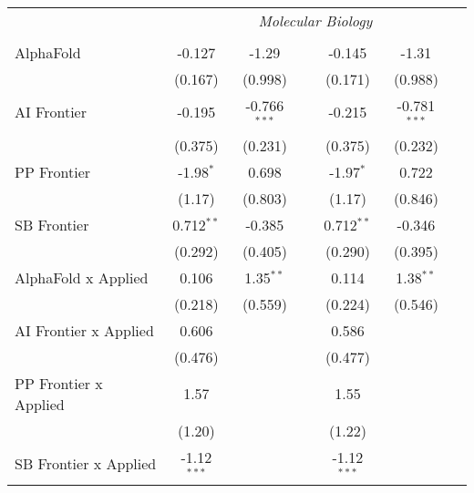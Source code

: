 \begin{tabular}{lcccccc}
 & \multicolumn{6}{c}{\textit{Molecular Biology}} \\ \\
   AlphaFold                    & -0.127        & -1.29          &                & -0.145        & -1.31          &   \\   
                                & (0.167)       & (0.998)        &                & (0.171)       & (0.988)        &   \\   
   AI Frontier                  & -0.195        & -0.766$^{***}$ &                & -0.215        & -0.781$^{***}$ &   \\   
                                & (0.375)       & (0.231)        &                & (0.375)       & (0.232)        &   \\   
   PP Frontier                  & -1.98$^{*}$   & 0.698          &                & -1.97$^{*}$   & 0.722          &   \\   
                                & (1.17)        & (0.803)        &                & (1.17)        & (0.846)        &   \\   
   SB Frontier                  & 0.712$^{**}$  & -0.385         &                & 0.712$^{**}$  & -0.346         &   \\   
                                & (0.292)       & (0.405)        &                & (0.290)       & (0.395)        &   \\   
   AlphaFold x Applied          & 0.106         & 1.35$^{**}$    &                & 0.114         & 1.38$^{**}$    &   \\   
                                & (0.218)       & (0.559)        &                & (0.224)       & (0.546)        &   \\   
   AI Frontier x Applied        & 0.606         &                &                & 0.586         &                &   \\   
                                & (0.476)       &                &                & (0.477)       &                &   \\   
   PP Frontier x Applied        & 1.57          &                &                & 1.55          &                &   \\   
                                & (1.20)        &                &                & (1.22)        &                &   \\   
   SB Frontier x Applied        & -1.12$^{***}$ &                &                & -1.12$^{***}$ &                &   \\   

\end{tabular}
